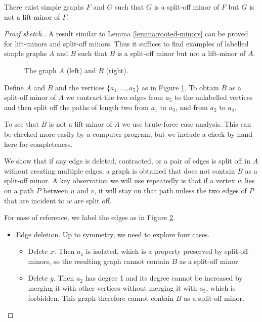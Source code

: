 \documentclass[11pt]{article}
\begin{document}
\begin{proposition}
    There exist simple graphs $F$ and $G$ such that $G$ is a split-off minor of $F$ but $G$ is not a lift-minor of $F$.
\end{proposition}
\begin{proof}[Proof sketch.]
    A result similar to Lemma \ref{lemma:rooted-minors} can be proved for lift-minors and split-off minors. Thus it suffices to find examples of labelled simple graphs $A$ and $B$ such that $B$ is a split-off minor but not a lift-minor of $A$.
    \begin{figure}[htbp]
        \centering
        
        \caption{The graph $A$ (left) and $B$ (right).}
        \label{fig:lift-minor-counterexample}
    \end{figure}
    
    
    Define $A$ and $B$ and the vertices $\{a_1,\ldots, a_5\}$ as in Figure \ref{fig:lift-minor-counterexample}.
    To obtain $B$ as a split-off minor of $A$ we contract the two edges from $a_5$ to the unlabelled vertices and then split off the paths of length two from $a_1$ to $a_3$, and from $a_2$ to $a_4$.
    \par 
    To see that $B$ is not a lift-minor of $A$ we use brute-force case analysis. This can be checked more easily by a computer program, but we include a check by hand here for completeness.\par 
    We show that if any edge is deleted, contracted, or a pair of edges is split off in $A$ without creating multiple edges, a graph is obtained that does not contain $B$ as a split-off minor.
    A key observation we will use repeatedly is that if a vertex $w$ lies on a path $P$ between $u$ and $v$, it will stay on that path unless the two edges of $P$ that are incident to $w$ are split off.

    \begin{figure}[htbp]
        \centering
        
        \caption{}
        \label{fig:lift-minor-counterexample-with-labels}
    \end{figure}
    For ease of reference, we label the edges as in Figure \ref{fig:lift-minor-counterexample-with-labels}.
    \begin{itemize}
        \item Edge deletion. Up to symmetry, we need to explore four cases.
        \begin{itemize}
            \item Delete $x$. Then $a_1$ is isolated, which is a property preserved by split-off minors, so the resulting graph cannot contain $B$ as a split-off minor.
            \item Delete $y$. Then $a_2$ has degree 1 and its degree cannot be increased by merging it with other vertices without merging it with $a_5$, which is forbidden. This graph therefore cannot contain $B$ as a split-off minor.
            

\end{itemize}
\end{itemize}
\end{proof}
\end{document}
